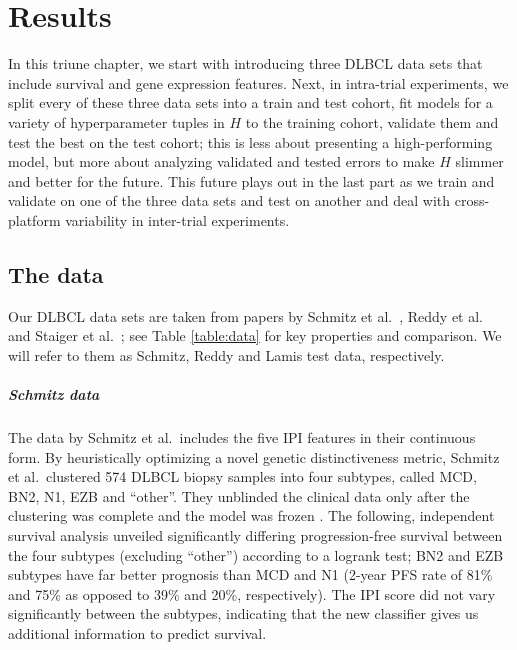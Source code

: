\chapter{Results} \label{chap:results}

In this triune chapter, we start with introducing three DLBCL data sets that include 
survival and gene expression features. Next, in intra-trial experiments, we split every of these 
three data sets into 
a train and test cohort, fit models for a variety of hyperparameter tuples in $H$ to the training 
cohort, validate them and test the best on the test cohort; this is less about presenting a 
high-performing model, but more about analyzing validated and tested errors to make $H$ slimmer and 
better for the future. This future plays out in the last part as we train and validate on one of 
the three data sets and test on another and deal with cross-platform variability in inter-trial 
experiments.

\section{The data}

Our DLBCL data sets are taken from papers by Schmitz et al.\ \cite{schmitz18}, Reddy et al.\ 
\cite{reddy17} and Staiger et al.\ \cite{staiger20}; see Table \ref{table:data} for key properties 
and comparison. We will refer to them as Schmitz, Reddy and Lamis test data, respectively.



\paragraph{Schmitz data}
The data by Schmitz et al.\ includes the five IPI features in their continuous form. 
By heuristically optimizing a novel genetic distinctiveness metric, Schmitz et al.\ 
clustered 574 DLBCL biopsy samples into four subtypes, called MCD, BN2, N1, EZB and ``other''. They 
unblinded the clinical data only after the clustering was complete and the 
model was frozen \cite[Appendix 1, pp. 16--18]{schmitz18}. The following, independent survival analysis 
unveiled significantly differing progression-free survival between the four subtypes (excluding 
``other'') according to a logrank test; BN2 and EZB subtypes have far better prognosis than MCD and 
N1 (2-year PFS rate of \num{81}\% and \num{75}\% as opposed to \num{39}\% and 
\num{20}\%, respectively). The IPI score did not vary significantly between the subtypes, 
indicating that the new classifier gives us additional information to predict survival.

